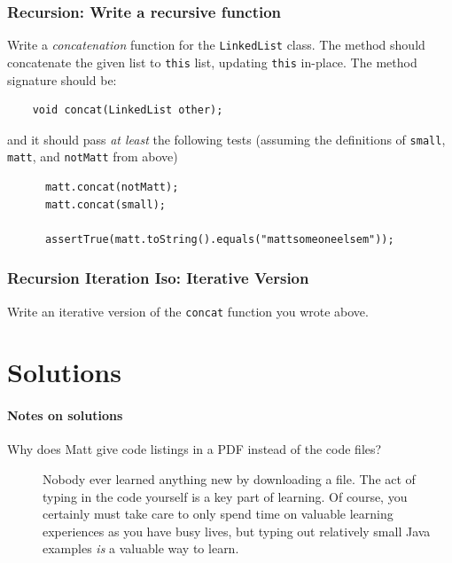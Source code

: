 \documentclass[twoside=false,DIV=14]{scrartcl}
\begin{document}
\section{Recursion: Write a recursive function}
Write a \emph{concatenation} function for the \lstinline|LinkedList| class.  The method should concatenate the given list to \lstinline|this| list, updating \lstinline|this| in-place.  The method signature should be:
    \begin{lstlisting}
    void concat(LinkedList other);
    \end{lstlisting}
    and it should pass \emph{at least} the following tests (assuming the definitions of \lstinline|small|, \lstinline|matt|, and \lstinline|notMatt| from above)
    \begin{lstlisting}
      matt.concat(notMatt);
      matt.concat(small);
      
      assertTrue(matt.toString().equals("mattsomeoneelsem"));
    \end{lstlisting}

\section{Recursion Iteration Iso: Iterative Version}
Write an iterative version of the \lstinline|concat| function you wrote above.
    
    \newpage\setcounter{section}{0}
\part*{Solutions}
    \subsection*{Notes on solutions}

    \begin{description}
    \item[Why does Matt give code listings in a PDF instead of the code files?]  Nobody ever learned anything new by downloading a file.  The act of typing in the code yourself is a key part of learning.  Of course, you certainly must take care to only spend time on valuable learning experiences as you have busy lives, but typing out relatively small Java examples \emph{is} a valuable way to learn.
    \end{description}

    
\end{document}
